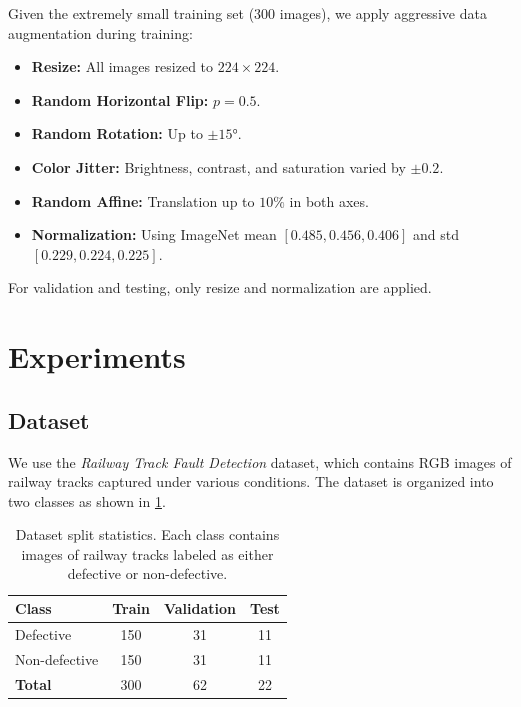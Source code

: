 \documentclass[10pt,twocolumn,letterpaper]{article}
\begin{document}
Given the extremely small training set (300 images), we apply aggressive data augmentation during training:
\begin{itemize}
    \item \textbf{Resize:} All images resized to $224 \times 224$.
    \item \textbf{Random Horizontal Flip:} $p=0.5$.
    \item \textbf{Random Rotation:} Up to $\pm 15°$.
    \item \textbf{Color Jitter:} Brightness, contrast, and saturation varied by $\pm 0.2$.
    \item \textbf{Random Affine:} Translation up to $10\%$ in both axes.
    \item \textbf{Normalization:} Using ImageNet mean $[0.485, 0.456, 0.406]$ and std $[0.229, 0.224, 0.225]$.
\end{itemize}

For validation and testing, only resize and normalization are applied.

\section{Experiments}
\label{sec:experiments}

\subsection{Dataset}
\label{sec:dataset}

We use the \textit{Railway Track Fault Detection} dataset, which contains RGB images of railway tracks captured under various conditions. The dataset is organized into two classes as shown in \cref{tab:dataset}.

\begin{table}[h]
\centering
\caption{Dataset split statistics. Each class contains images of railway tracks labeled as either defective or non-defective.}
\label{tab:dataset}
\begin{tabular}{lccc}
\toprule
\textbf{Class} & \textbf{Train} & \textbf{Validation} & \textbf{Test} \\
\midrule
Defective       & 150 & 31 & 11 \\
Non-defective   & 150 & 31 & 11 \\
\midrule
\textbf{Total}  & 300 & 62 & 22 \\
\bottomrule
\end{tabular}
\end{table}
\end{document}
